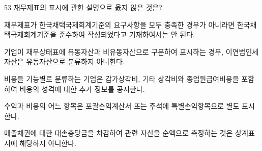 \begin{question}{53}
재무제표의 표시에 관한 설명으로 옳지 않은 것은?
\begin{choices}
  \item 재무제표가 한국채택국제회계기준의 요구사항을 모두 충족한 경우가 아니라면 한국채택국제회계기준을 준수하여 작성되었다고 기재하여서는 안 된다.
  \item 기업이 재무상태표에 유동자산과 비유동자산으로 구분하여 표시하는 경우, 이연법인세자산은 유동자산으로 분류하지 아니한다.
  \item 비용을 기능별로 분류하는 기업은 감가상각비, 기타 상각비와 종업원급여비용을 포함하여 비용의 성격에 대한 추가 정보를 공시한다.
  \item 수익과 비용의 어느 항목은 포괄손익계산서 또는 주석에 특별손익항목으로 별도 표시한다.
  \item 매출채권에 대한 대손충당금을 차감하여 관련 자산을 순액으로 측정하는 것은 상계표시에 해당하지 아니한다.
\end{choices}
\end{question}
